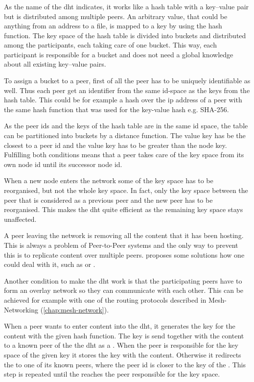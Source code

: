 \subsubsection{}\label{sec:p2p-dht}
As the name of the \gls{dht} indicates, it works like a hash table with a key–value pair but is distributed among multiple peers. An arbitrary value, that could be anything from an address to a file, is mapped to a key by using the hash function. The key space of the hash table is divided into buckets and distributed among the participants, each taking care of one bucket. This way, each participant is responsible for a bucket and does not need a global knowledge about all existing key–value pairs.

To assign a bucket to a peer, first of all the peer has to be uniquely identifiable as well. Thus each peer get an identifier from the same id-space as the keys from the hash table. This could be for example a hash over the \gls{ip} address of a peer with the same hash function that was used for the key-value hash e.g. SHA-256.

As the peer ids and the keys of the hash table are in the same id space, the table can be partitioned into buckets by a distance function. The value key has be the closest to a peer id and the value key has to be greater than the node key. Fulfilling both conditions means that a peer takes care of the key space from its own node id until its successor node id.

When a new node enters the network some of the key space has to be reorganised, but not the whole key space. In fact, only the key space between the peer that is considered as a previous peer and the new peer has to be reorganised. This makes the \gls{dht} quite efficient as the remaining key space stays unaffected. 

A peer leaving the network is removing all the content that it has been hosting. This is always a problem of Peer-to-Peer systems and the only way to prevent this is to replicate content over multiple peers. \citet[\S3]{chord} proposes some solutions how one could deal with it, such as  or .

Another condition to make the \gls{dht} work is that the participating peers have to form an overlay network so they can communicate with each other. This can be achieved for example with one of the routing protocols described in Mesh-Networking (\vref{chap:mesh-network}).

When a peer wants to enter content into the \gls{dht}, it generates the key for the content with the given hash function. The key is send together with the content to a known peer of the the \gls{dht} as a . When the peer is responsible for the key space of the given key it stores the key with the content. Otherwise it redirects the  to one of its known peers, where the peer id is closer to the key of the . This step is repeated until the  reaches the peer responsible for the key space.

